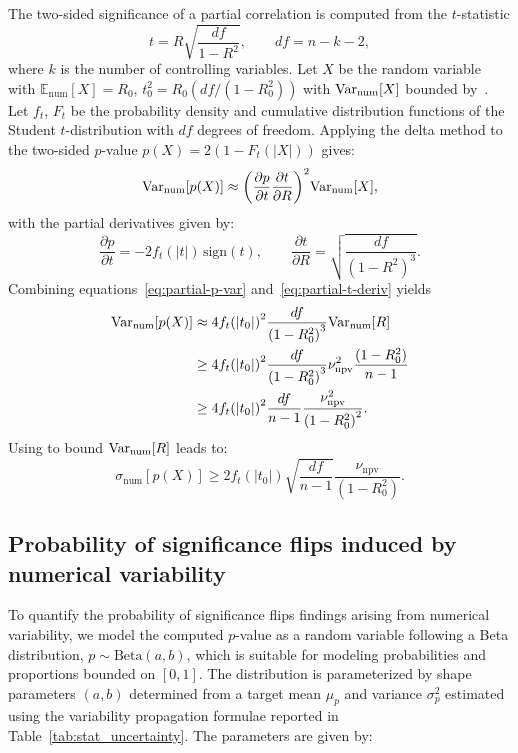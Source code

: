 The two-sided significance of a partial correlation is computed from the
$t$-statistic
\[
    t
    =
    R\sqrt{\frac{df}{1-R^{2}}},
    \qquad
    df = n-k-2,
\]
where $k$ is the number of controlling variables. Let $X$ be the random
variable with $\mathbb{E}_{\mathrm{num}}[X]=R_0$, $t_0^2=R_0(df/(1-R_0^2))$
with $\mathrm{Var}_{\mathrm{num}}[X]$ bounded by~. Let
$f_t$, $F_t$ be the probability density and cumulative distribution functions
of the Student $t$-distribution with $df$ degrees of freedom. Applying the
delta method to the two-sided $p$-value $p(X) = 2\left(1 - F_t(|X|)\right)$
gives:
\begin{equation}
    \mathrm{Var}_{\mathrm{num}}[p(X)]
    \approx
    {\left(\frac{\partial p}{\partial t}\frac{\partial t}{\partial R}\right)}^{2}
    \mathrm{Var}_{\mathrm{num}}[X],
    \label{eq:partial-p-var}
\end{equation}
with the partial derivatives given by:
\begin{equation}
    \frac{\partial p}{\partial t} = -2 f_t(|t|)\,\mathrm{sign}(t),\qquad
    \frac{\partial t}{\partial R} = \sqrt{\frac{df}{{(1-R^{2})}^{3}}}.
    \label{eq:partial-t-deriv}
\end{equation}
Combining equations~\eqref{eq:partial-p-var} and~\eqref{eq:partial-t-deriv}
yields
\begin{align}
    \mathrm{Var}_{\mathrm{num}}[p(X)]
     & \approx
    4f_t{(|t_0|)}^{2}\frac{df}{{(1-R_0^{2})}^{3}}\mathrm{Var}_{\mathrm{num}}[R] \\
     & \geq
    4f_t{(|t_0|)}^{2}\frac{df}{{(1-R_0^{2})}^{3}}
    \nu_{\mathrm{npv}}^{2}\frac{(1 - R_0^{2})}{n-1}                     \\
     & \geq
    4f_t{(|t_0|)}^{2}\frac{df}{n-1}\frac{\nu_{\mathrm{npv}}^{2}}{{(1-R_0^{2})}^{2}}.
\end{align}
Using  to bound $\mathrm{Var}_{\mathrm{num}}[R]$ leads to:
\[
    \sigma_{\mathrm{num}}[p(X)]
    \geq
    2f_t(|t_0|)\sqrt{\frac{df}{n-1}} \frac{\nu_{\mathrm{npv}}}{(1-R_0^{2})}.
\]

\subsection{Probability of significance flips induced by numerical
    variability\label{sec:false-positives-modeling}}

To quantify the probability of significance flips findings arising from
numerical variability, we model the computed $p$-value as a random variable
following a Beta distribution, $p \sim \text{Beta}(a, b)$, which is suitable
for modeling probabilities and proportions bounded on $[0,1]$. The distribution
is parameterized by shape parameters $(a,b)$ determined from a target mean
$\mu_p$ and variance $\sigma_p^2$ estimated using the variability propagation
formulae reported in Table~\ref{tab:stat_uncertainty}. The parameters are given
by:

